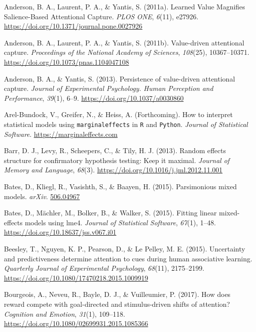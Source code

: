 \documentclass[
  man,
  floatsintext,
  longtable,
  nolmodern,
  notxfonts,
  notimes,
  mask,
  colorlinks=true,linkcolor=blue,citecolor=blue,urlcolor=blue]{apa7}
\newlength{\cslhangindent}
\newenvironment{CSLReferences}[2] %
 {\begin{list}{}{%
  \setlength{\itemindent}{0pt}
  \setlength{\leftmargin}{0pt}
  \setlength{\parsep}{0pt}
  \ifodd #1
   \setlength{\leftmargin}{\cslhangindent}
   \setlength{\itemindent}{-1\cslhangindent}
  \fi
  \setlength{\itemsep}{#2\baselineskip}}}
 {\end{list}}
\begin{document}
\begin{CSLReferences}{1}{0}
Anderson, B. A., Laurent, P. A., \& Yantis, S. (2011a). Learned {Value
Magnifies Salience-Based Attentional Capture}. \emph{PLOS ONE},
\emph{6}(11), e27926. \url{https://doi.org/10.1371/journal.pone.0027926}

Anderson, B. A., Laurent, P. A., \& Yantis, S. (2011b). Value-driven
attentional capture. \emph{Proceedings of the National Academy of
Sciences}, \emph{108}(25), 10367--10371.
\url{https://doi.org/10.1073/pnas.1104047108}

Anderson, B. A., \& Yantis, S. (2013). Persistence of value-driven
attentional capture. \emph{Journal of Experimental Psychology. Human
Perception and Performance}, \emph{39}(1), 6--9.
\url{https://doi.org/10.1037/a0030860}

Arel-Bundock, V., Greifer, N., \& Heiss, A. (Forthcoming). How to
interpret statistical models using \texttt{marginaleffects} in
\texttt{R} and \texttt{Python}. \emph{Journal of Statistical Software}.
\url{https://marginaleffects.com}

Barr, D. J., Levy, R., Scheepers, C., \& Tily, H. J. (2013). Random
effects structure for confirmatory hypothesis testing: Keep it maximal.
\emph{Journal of Memory and Language}, \emph{68}(3).
\url{https://doi.org/10.1016/j.jml.2012.11.001}

Bates, D., Kliegl, R., Vasishth, S., \& Baayen, H. (2015). Parsimonious
mixed models. \emph{arXiv}. \href{https://506.04967}{506.04967}

Bates, D., Mächler, M., Bolker, B., \& Walker, S. (2015). Fitting linear
mixed-effects models using {lme4}. \emph{Journal of Statistical
Software}, \emph{67}(1), 1--48.
\url{https://doi.org/10.18637/jss.v067.i01}

Beesley, T., Nguyen, K. P., Pearson, D., \& Le Pelley, M. E. (2015).
Uncertainty and predictiveness determine attention to cues during human
associative learning. \emph{Quarterly Journal of Experimental
Psychology}, \emph{68}(11), 2175--2199.
\url{https://doi.org/10.1080/17470218.2015.1009919}

Bourgeois, A., Neveu, R., Bayle, D. J., \& Vuilleumier, P. (2017). How
does reward compete with goal-directed and stimulus-driven shifts of
attention? \emph{Cognition and Emotion}, \emph{31}(1), 109--118.
\url{https://doi.org/10.1080/02699931.2015.1085366}


\end{CSLReferences}
\end{document}
